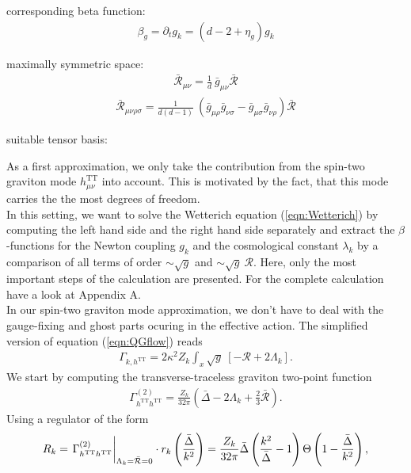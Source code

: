corresponding beta function:
\begin{align}
	\beta_g = \partial_t g_k = \left(d-2 + \eta_g\right)g_k
\end{align}

maximally symmetric space:
\begin{align}
	\bar{\mathcal{R}}_{\mu\nu} = \frac{1}{d} \ \bar{g}_{\mu\nu} \bar{\mathcal{R}}
\end{align}
\begin{align}
	\bar{\mathcal{R}}_{\mu\nu\rho\sigma} = \frac{1}{d(d-1)} \ (\bar{g}_{\mu\rho}\bar{g}_{\nu\sigma} - \bar{g}_{\mu\sigma}\bar{g}_{\nu\rho}) \bar{\mathcal{R}}
\end{align}

suitable tensor basis:

As a first approximation, we only take the contribution from the spin-two graviton mode $h_{\mu\nu}^{\text{TT}}$ into account. This is motivated by the fact, that this mode carries the the most degrees of freedom.\\ %
In this setting, we want to solve the Wetterich equation (\ref{eqn:Wetterich}) by computing the left hand side and the right hand side separately and extract the $\beta$-functions for the Newton coupling $g_k$ and the cosmological constant $\lambda_k$ by a comparison of all terms of order $\sim\sqrt{g}$ and $\sim \sqrt{g} \ \mathcal{R}$. Here, only the most important steps of the calculation are presented. For the complete calculation have a look at Appendix A. \\%
In our spin-two graviton mode approximation, we don't have to deal with the gauge-fixing and ghost parts ocuring in the effective action. The simplified version of equation (\ref{eqn:QGflow}) reads
\begin{align}
	\Gamma_{k, h^{\text{TT}}} = 2\kappa^2Z_k \int_x \sqrt{g} \ [-\mathcal{R} + 2\Lambda_k].
\end{align}
We start by computing the transverse-traceless graviton two-point function
\begin{align}
\Gamma_{h^{\text{TT}}h^{\text{TT}}}^{(2)} = \frac{Z_k}{32\pi}\left(\bar{\Delta} - 2\Lambda_k+\frac{2}{3}\bar{\mathcal{R}}\right).
\end{align}
Using a regulator of the form
\begin{align}
R_k  = \eval{\Gamma_{h^{\text{TT}}h^{\text{TT}}}^{(2)}}_{\Lambda_k=\bar{\mathcal{R}}=0} \cdot r_k\left(\frac{\bar{\Delta}}{k^2}\right) = \frac{Z_k}{32\pi}\bar{\Delta}\left(\frac{k^2}{\bar{\Delta}}-1\right)\Theta\left(1-\frac{\bar{\Delta}}{k^2}\right), \nonumber
\end{align}
